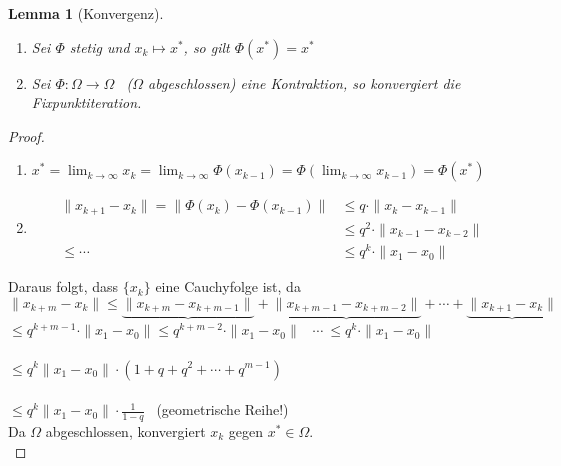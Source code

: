 \documentclass[10pt,a4paper]{article}
\newtheorem{lemma}{Lemma}[section]
\theoremstyle{definition} \newtheorem{definition}{Definition}[section]
\theoremstyle{remark}     \newtheorem*{bemerkung}{\textbf{Bemerkung}} %
\begin{document}
\begin{lemma}[Konvergenz]
~ %
\begin{enumerate}
\item[a)] Sei $\Phi$ stetig und $x_k \longmapsto x^*$, so gilt $\Phi(x^*)=x^*$\\
\item[b)] Sei $\Phi: \Omega \longrightarrow \Omega$ \ ($\Omega$ abgeschlossen) eine Kontraktion, so konvergiert die Fixpunktiteration.
\end{enumerate}
\end{lemma}

\begin{proof}
~
\begin{enumerate}
\item[a)] $x^*=\lim_{k \to \infty}x_k=\lim_{k \to \infty}\Phi(x_{k-1})=\Phi(\lim_{k \to \infty}x_{k-1})=\Phi(x^*)$
\item[b)]
\begin{align*}
\|x_{k+1}-x_k\| = \|\Phi(x_k)-\Phi(x_{k-1})\| &\leq q\cdot \|x_k-x_{k-1}\| \\
                                              &\leq q^2\cdot \|x_{k-1}-x_{k-2}\| \\
                                   \leq \cdots&\leq q^k\cdot \|x_1-x_0\|
\end{align*}
\end{enumerate}

Daraus folgt, dass $\{x_k\}$ eine Cauchyfolge ist, da
\\$\|x_{k+m}-x_k\|\leq \underbrace{\|x_{k+m}-x_{k+m-1}\|}+\underbrace{\|x_{k+m-1}-x_{k+m-2}\|}+\cdots +\underbrace{\|x_{k+1}-x_k\|}$
\\\hspace*{21mm}$\leq q^{k+m-1}\cdot \|x_1-x_0\|$\hspace*{3mm}$\leq q^{k+m-2}\cdot \|x_1-x_0\|$ \ $\cdots \ \leq q^k\cdot \|x_1-x_0\|$\\
\\\hspace*{21mm}$\leq q^k\|x_1-x_0\| \cdot (1+q+q^2+\cdots +q^{m-1})$\\
\\\hspace*{21mm}$\leq q^k\|x_1-x_0\| \cdot \frac{1}{1-q}$ \ (geometrische Reihe!)
\newline
\\Da $\Omega$ abgeschlossen, konvergiert $x_k$ gegen $x^* \in \Omega$.\\
\end{proof}
\end{document}
